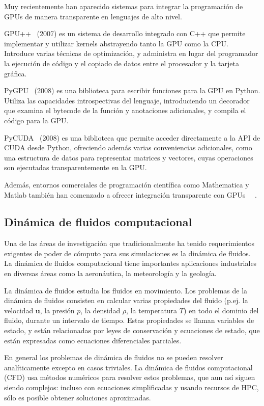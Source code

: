 \documentclass[11pt,spanish]{article}
\newcommand{\vel}{\mathbf{u}}
\begin{document}
Muy recientemente han aparecido sistemas para integrar la programación de GPUs
de manera transparente en lenguajes de alto nivel.

GPU++~\cite{gpupp} (2007) es un sistema de desarrollo integrado con C++ que
permite implementar y utilizar kernels abstrayendo tanto la GPU como la CPU.
Introduce varias técnicas de optimización, y administra en lugar del programador
la ejecución de código y el copiado de datos entre el procesador y la tarjeta
gráfica.

PyGPU~\cite{pygpu} (2008) es una biblioteca para escribir funciones para la
GPU en Python. Utiliza las capacidades introspectivas del lenguaje,
introduciendo un decorador que examina el bytecode de la función y anotaciones
adicionales, y compila el código para la GPU.

PyCUDA~\cite{pycuda} (2008) es una biblioteca que permite acceder directamente a
la API de CUDA desde Python, ofreciendo además varias conveniencias adicionales,
como una estructura de datos para representar matrices y vectores, cuyas
operaciones son ejecutadas transparentemente en la GPU.

Además, entornos comerciales de programación científica como Mathematica y
Matlab también han comenzado a ofrecer integración transparente con GPUs~%
\cite{nvidia-mathematica}~\cite{nvidia-matlab}.


\subsection{Dinámica de fluidos computacional}
Una de las áreas de investigación que tradicionalmente ha tenido requerimientos
exigentes de poder de cómputo para sus simulaciones es la dinámica de fluidos.
La dinámica de fluidos computacional tiene importantes aplicaciones industriales
en diversas áreas como la aeronáutica, la meteorología y la geología.

La dinámica de fluidos estudia los fluidos en movimiento.  Los problemas de la
dinámica de fluidos consisten en calcular varias propiedades del fluido (p.ej.
la velocidad $\vel$, la presión $p$, la densidad $\rho$, la temperatura $T$) en
todo el dominio del fluido, durante un intervalo de tiempo.  Estas propiedades
se llaman variables de estado, y están relacionadas por leyes de conservación y
ecuaciones de estado, que están expresadas como ecuaciones diferenciales parciales.

En general los problemas de dinámica de fluidos no se pueden resolver
analíticamente excepto en casos triviales.  La dinámica de fluidos computacional
(CFD) usa métodos numéricos para resolver estos problemas, que aun así siguen
siendo complejos:  incluso con ecuaciones simplificadas y usando recursos de
HPC, sólo es posible obtener soluciones aproximadas.
\end{document}
